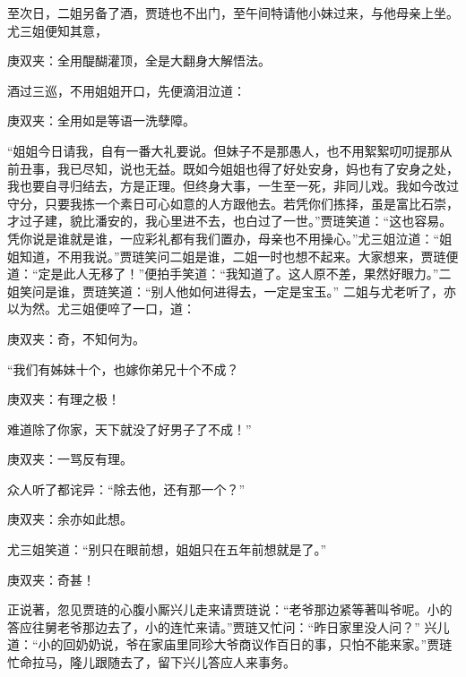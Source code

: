 \begin{parag}
    至次日，二姐另备了酒，贾琏也不出门，至午间特请他小妹过来，与他母亲上坐。尤三姐便知其意，\begin{note}庚双夹：全用醍醐灌顶，全是大翻身大解悟法。\end{note}酒过三巡，不用姐姐开口，先便滴泪泣道：\begin{note}庚双夹：全用如是等语一洗孽障。\end{note}“姐姐今日请我，自有一番大礼要说。但妹子不是那愚人，也不用絮絮叨叨提那从前丑事，我已尽知，说也无益。既如今姐姐也得了好处安身，妈也有了安身之处，我也要自寻归结去，方是正理。但终身大事，一生至一死，非同儿戏。我如今改过守分，只要我拣一个素日可心如意的人方跟他去。若凭你们拣择，虽是富比石崇，才过子建，貌比潘安的，我心里进不去，也白过了一世。”贾琏笑道：“这也容易。凭你说是谁就是谁，一应彩礼都有我们置办，母亲也不用操心。”尤三姐泣道：“姐姐知道，不用我说。”贾琏笑问二姐是谁，二姐一时也想不起来。大家想来，贾琏便道：“定是此人无移了！”便拍手笑道：“我知道了。这人原不差，果然好眼力。”二姐笑问是谁，贾琏笑道：“别人他如何进得去，一定是宝玉。” 二姐与尤老听了，亦以为然。尤三姐便啐了一口，道：\begin{note}庚双夹：奇，不知何为。\end{note}“我们有姊妹十个，也嫁你弟兄十个不成？\begin{note}庚双夹：有理之极！\end{note}难道除了你家，天下就没了好男子了不成！”\begin{note}庚双夹：一骂反有理。\end{note}众人听了都诧异：“除去他，还有那一个？”\begin{note}庚双夹：余亦如此想。\end{note}尤三姐笑道：“别只在眼前想，姐姐只在五年前想就是了。”\begin{note}庚双夹：奇甚！\end{note}
\end{parag}


\begin{parag}
    正说著，忽见贾琏的心腹小厮兴儿走来请贾琏说：“老爷那边紧等著叫爷呢。小的答应往舅老爷那边去了，小的连忙来请。”贾琏又忙问：“昨日家里没人问？” 兴儿道：“小的回奶奶说，爷在家庙里同珍大爷商议作百日的事，只怕不能来家。”贾琏忙命拉马，隆儿跟随去了，留下兴儿答应人来事务。
\end{parag}


